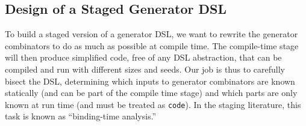 \documentclass[acmsmall]{acmart}
\theoremstyle{definition}
\begin{document}

\subsection{Design of a Staged Generator DSL}
\label{subsection:basic-design}
To build a staged version of a generator DSL, we want to rewrite the generator
combinators to do as much as possible at compile time.
The compile-time stage will then produce simplified code, free of any DSL abstraction, that can be compiled and run
with different sizes and seeds.
Our job is thus to carefully bisect the DSL, determining which inputs to generator
combinators are known statically (and can be part of the compile time stage) and
which parts are only known at run time (and must be treated as \texttt{code}).
In the staging literature, this task is known as ``binding-time
analysis\cite{jones1993partial}.''
\end{document}
